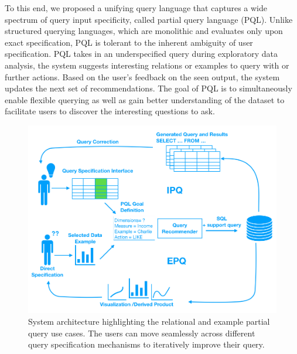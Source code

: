 \documentclass{sig-alternate-05-2015}
\begin{document}
\par To this end, we proposed a unifying query language that captures a wide spectrum of query input specificity, called partial query language (PQL). Unlike structured querying languages, which are monolithic and evaluates only upon exact specification, PQL is tolerant to the inherent ambiguity of user specification. PQL takes in an underspecified query during exploratory data analysis, the system suggests interesting relations or examples to query with or further actions. Based on the user's feedback on the seen output, the system updates the next set of recommendations. The goal of PQL is to simultaneously enable flexible querying as well as gain better understanding of the dataset to facilitate users to discover the interesting questions to ask.



\begin{figure}[ht!]\label{system}
\includegraphics[width=\linewidth]{figures/system.png}
\caption{System architecture highlighting the relational and example partial query use cases. The users can move seamlessly across different query specification mechanisms to iteratively improve their query.}
\end{figure}
\end{document}
